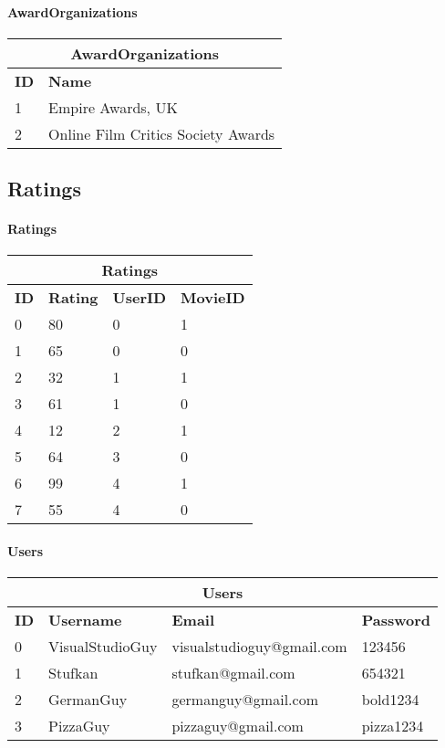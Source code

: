 \paragraph{AwardOrganizations}

\begin{center}
\begin{tabular}{|l|l|}
\hline
\multicolumn{2}{|c|}{AwardOrganizations} \\ \hline \hline
\textbf{ID} & \textbf{Name} \\ \hline \hline
1 & Empire Awards, UK \\ \hline
2 & Online Film Critics Society Awards \\ \hline
\end{tabular}
\end{center}

\subsection{Ratings}

\paragraph{Ratings}

\begin{center}
\begin{tabular}{|l|l|l|l|}
\hline
\multicolumn{4}{|c|}{Ratings} \\ \hline \hline
\textbf{ID} & \textbf{Rating} & \textbf{UserID} & \textbf{MovieID} \\ \hline \hline
0 & 80 & 0 & 1 \\ \hline
1 & 65 & 0 & 0 \\ \hline
2 & 32 & 1 & 1 \\ \hline
3 & 61 & 1 & 0 \\ \hline
4 & 12 & 2 & 1 \\ \hline
5 & 64 & 3 & 0 \\ \hline
6 & 99 & 4 & 1 \\ \hline
7 & 55 & 4 & 0 \\ \hline
\end{tabular}
\end{center}

\paragraph{Users}

\begin{center}
\begin{tabular}{|l|l|l|l|}
\hline
\multicolumn{4}{|c|}{Users} \\ \hline \hline
\textbf{ID} & \textbf{Username} & \textbf{Email} & \textbf{Password} \\ \hline \hline
0 & VisualStudioGuy & visualstudioguy@gmail.com & 123456 \\ \hline
1 & Stufkan & stufkan@gmail.com & 654321 \\ \hline
2 & GermanGuy & germanguy@gmail.com & bold1234 \\ \hline
3 & PizzaGuy & pizzaguy@gmail.com & pizza1234 \\ \hline
\end{tabular}
\end{center}

